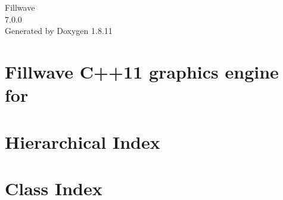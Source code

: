 \documentclass[twoside]{book}
\newcommand{\+}{\discretionary{\mbox{\scriptsize$\hookleftarrow$}}{}{}}
\newcommand{\clearemptydoublepage}{%
  \newpage{\pagestyle{empty}\cleardoublepage}%
}
\begin{document}
\hypersetup{pageanchor=false,
             bookmarksnumbered=true,
             pdfencoding=unicode
            }
\begin{titlepage}
\vspace*{7cm}
\begin{center}%
{\Large Fillwave \\[1ex]\large 7.\+0.\+0 }\\
\vspace*{1cm}
{\large Generated by Doxygen 1.8.11}\\
\end{center}
\end{titlepage}
\clearemptydoublepage
\tableofcontents
\clearemptydoublepage
{}
\hypersetup{pageanchor=true}

\chapter{Fillwave C++11 graphics engine for}
\label{index}\hypertarget{index}{}
\chapter{Hierarchical Index}

\chapter{Class Index}

\end{document}
